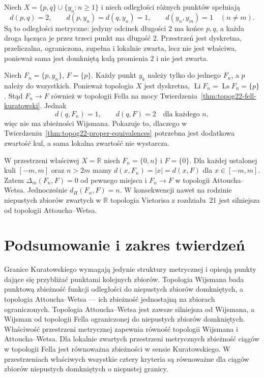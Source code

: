 \begin{przyklad}
\label{ex:topog22-nonproper}
Niech \(X=\{p,q\}\cup\{y_n:n\ge1\}\)
i niech odległości różnych punktów spełniają
\[
 d(p,q)=2,\qquad
 d(p,y_n)=d(q,y_n)=1,\qquad
 d(y_n,y_m)=1\quad(n\neq m).
\]
Są to odległości metryczne:
jedyny odcinek długości \(2\)
ma końce \(p,q\), a każda droga
łącząca je przez trzeci punkt ma długość \(2\).
Przestrzeń jest dyskretna, przeliczalna,
ograniczona, zupełna i lokalnie zwarta,
lecz nie jest właściwa, ponieważ sama
jest domkniętą kulą promienia \(2\)
i nie jest zwarta.

Niech \(F_n=\{p,y_n\}\), \(F=\{p\}\).
Każdy punkt \(y_k\) należy tylko do jednego \(F_n\),
a \(p\) należy do wszystkich.
Ponieważ topologia \(X\) jest dyskretna,
\(\operatorname{Li}F_n=\operatorname{Ls}F_n=\{p\}\).
Stąd \(F_n\to F\) również w topologii Fella
na mocy Twierdzenia~\ref{thm:topog22-fell-kuratowski}.
Jednak
\[
 d(q,F_n)=1,\qquad d(q,F)=2
 \quad\text{dla każdego }n,
\]
więc nie ma zbieżności Wijsmana.
Pokazuje to, dlaczego w
Twierdzeniu~\ref{thm:topog22-proper-equivalences}
potrzebna jest dodatkowa zwartość kul,
a sama lokalna zwartość nie wystarcza.
\end{przyklad}

\begin{przyklad}
\label{ex:topog22-aw-not-hausdorff}
W przestrzeni właściwej \(X=\mathbb R\)
niech \(F_n=\{0,n\}\) i \(F=\{0\}\).
Dla każdej ustalonej kuli \([-m,m]\)
oraz \(n>2m\) mamy
\(d(x,F_n)=|x|=d(x,F)\) dla \(x\in[-m,m]\).
Zatem \(\Delta_m(F_n,F)=0\) od pewnego miejsca
i \(F_n\to F\) w topologii Attoucha--Wetsa.
Jednocześnie \(d_H(F_n,F)=n\).
W konsekwencji nawet na rodzinie
niepustych zbiorów zwartych w \(\mathbb R\)
topologia Vietorisa z rozdziału~21
jest silniejsza od topologii Attoucha--Wetsa.
\end{przyklad}

\section{Podsumowanie i zakres twierdzeń}
\label{sec:topog22-summary}

Granice Kuratowskiego wymagają jedynie struktury metrycznej
i opisują punkty dające się przybliżać punktami kolejnych zbiorów.
Topologia Wijsmana bada punktową zbieżność funkcji odległości
do niepustych zbiorów domkniętych,
a topologia Attoucha--Wetsa --- ich zbieżność jednostajną
na zbiorach ograniczonych.
Topologia Attoucha--Wetsa jest zawsze silniejsza od Wijsmana,
a Wijsman od topologii Fella ograniczonej
do niepustych zbiorów domkniętych.
Właściwość przestrzeni metrycznej zapewnia
równość topologii Wijsmana i Attoucha--Wetsa.
Dla lokalnie zwartych przestrzeni metrycznych
zbieżność ciągów w topologii Fella jest równoważna
zbieżności w sensie Kuratowskiego.
W przestrzeniach właściwych wszystkie cztery
kryteria są równoważne dla ciągów zbiorów
niepustych domkniętych o niepustej granicy.

